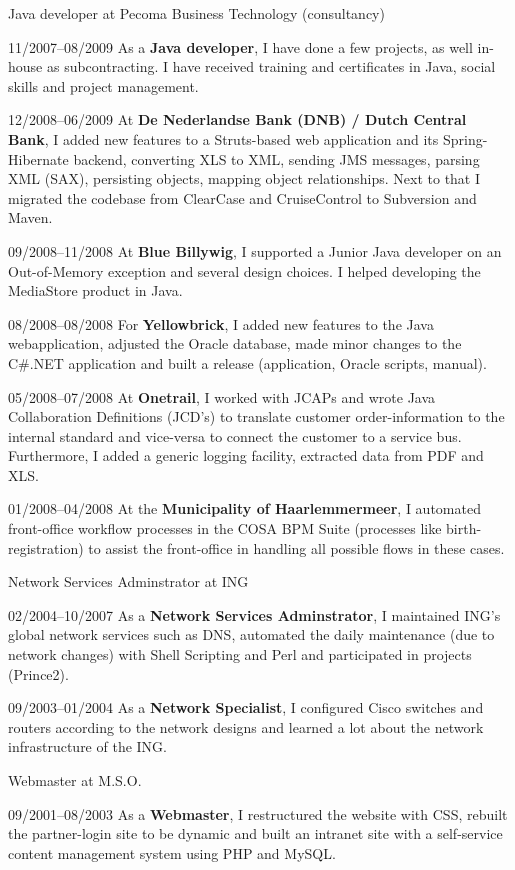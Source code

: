 \documentclass[11pt,a4paper]{article}
\begin{document}
\begin{cv}{}
	\begin{cvlist}{Java developer at Pecoma Business Technology (consultancy)}
		\item[11/2007--08/2009] As a \textbf{Java developer}, I have done a few
		projects, as well in-house as subcontracting. I have received training and
		certificates in Java, social skills and project management.
		\item[\color{gray}12/2008--06/2009] At \textbf{De Nederlandse Bank (DNB) /
		Dutch Central Bank}, I added new features to a Struts-based web application
		and its Spring-Hibernate backend, converting XLS to XML, sending JMS
		messages, parsing XML (SAX), persisting objects, mapping object
		relationships. Next to that I migrated the codebase from ClearCase and
		CruiseControl to Subversion and Maven.
		\item[\color{gray}09/2008--11/2008] At \textbf{Blue Billywig}, I supported
		a Junior Java developer on an Out-of-Memory exception and several design
		choices. I helped developing the MediaStore product in Java.
		\item[\color{gray}08/2008--08/2008] For \textbf{Yellowbrick}, I added new
		features to the Java webapplication, adjusted the Oracle database, made
		minor changes to the C\#.NET application and built a release (application,
		Oracle scripts, manual).
		\item[\color{gray}05/2008--07/2008] At \textbf{Onetrail}, I worked with
		JCAPs and wrote Java Collaboration Definitions (JCD's) to translate
		customer order-information to the internal standard and vice-versa to
		connect the customer to a service bus. Furthermore, I added a generic
		logging facility, extracted data from PDF and XLS.
		\item[\color{gray}01/2008--04/2008] At the \textbf{Municipality of
		Haarlemmermeer}, I automated front-office workflow processes in the COSA
		BPM Suite (processes like birth-registration) to assist the front-office in
		handling all possible flows in these cases.
	\end{cvlist}

	\begin{cvlist}{Network Services Adminstrator at ING}
		\item[02/2004--10/2007] As a \textbf{Network Services Adminstrator}, I
		maintained ING’s global network services such as DNS, automated the daily
		maintenance (due to network changes) with Shell Scripting and Perl and
		participated in projects (Prince2).
		\item[09/2003--01/2004] As a \textbf{Network Specialist}, I configured
		Cisco switches and routers according to the network designs and learned a
		lot about the network infrastructure of the ING.
	\end{cvlist}

	\begin{cvlist}{Webmaster at M.S.O.}
		\item[09/2001--08/2003] As a \textbf{Webmaster}, I restructured the website
		with CSS, rebuilt the partner-login site to be dynamic and built an
		intranet site with a self-service content management system using PHP and
		MySQL.
	\end{cvlist}

\end{cv}
\end{document}

